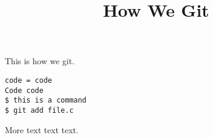 \documentclass[14pt]{amsart}
\begin{document}
\title{How We Git}

\maketitle

This is how we git.

\begin{lstlisting}
code = code
Code code
$ this is a command
$ git add file.c
\end{lstlisting}

More text text text.
\end{document}
